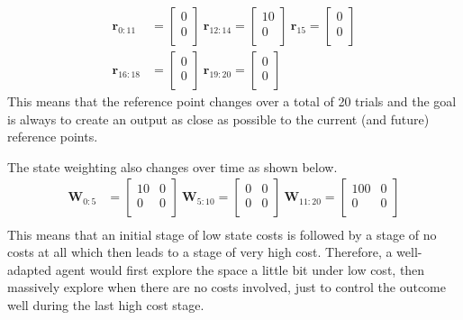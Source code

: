 \documentclass[10pt,letterpaper]{article}
\begin{document}
\begin{align*}
\mathbf{r}_{0:11}&=
\begin{bmatrix}
0\\
0\\
\end{bmatrix}~
\mathbf{r}_{12:14}=
\begin{bmatrix}
10\\
0\\
\end{bmatrix}~
\mathbf{r}_{15}=
\begin{bmatrix}
0\\
0\\
\end{bmatrix}\\
\mathbf{r}_{16:18}&=
\begin{bmatrix}
0\\
0\\
\end{bmatrix}~
\mathbf{r}_{19:20}=
\begin{bmatrix}
0\\
0\\
\end{bmatrix}
\end{align*}
This means that the reference point changes over a total of 20 trials and the goal is always to create an output as close as possible to the current (and future) reference points.

The state weighting also changes over time as shown below.
\begin{align*}
\mathbf{W}_{0:5}&=
\begin{bmatrix}
10 & 0\\
0 & 0\\
\end{bmatrix}~
\mathbf{W}_{5:10}=
\begin{bmatrix}
0 & 0\\
0 & 0\\
\end{bmatrix}~
\mathbf{W}_{11:20}=
\begin{bmatrix}
100 & 0\\
0 & 0\\
\end{bmatrix}\\
\end{align*}
This means that an initial stage of low state costs is followed by a stage of no costs at all which then leads to a stage of very high cost. Therefore, a well-adapted agent would first explore the space a little bit under low cost, then massively explore when there are no costs involved, just to control the outcome well during the last high cost stage.
\end{document}

